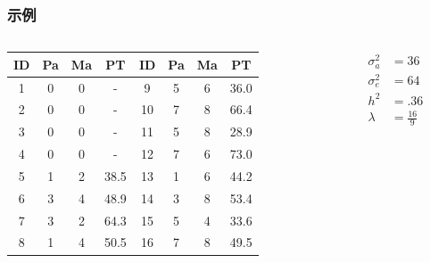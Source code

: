 \documentclass[serif,aspectratio=169]{beamer}
\begin{document}
\begin{frame}
  \frametitle{示例}
  \begin{columns}
    \begin{column}{.8\textwidth}
      \centering
      \begin{tabular}{cccc|cccc}
        ID & Pa & Ma & PT & ID & Pa & Ma & PT \\\hline
        1 & 0 & 0 &  -   &  9 & 5 & 6 & 36.0\\
        2 & 0 & 0 &  -   & 10 & 7 & 8 & 66.4\\
        3 & 0 & 0 &  -   & 11 & 5 & 8 & 28.9\\
        4 & 0 & 0 &  -   & 12 & 7 & 6 & 73.0\\
        5 & 1 & 2 & 38.5 & 13 & 1 & 6 & 44.2\\
        6 & 3 & 4 & 48.9 & 14 & 3 & 8 & 53.4\\
        7 & 3 & 2 & 64.3 & 15 & 5 & 4 & 33.6\\
        8 & 1 & 4 & 50.5 & 16 & 7 & 8 & 49.5 
      \end{tabular}
    \end{column}

    \begin{column}{.2\textwidth}
      \begin{align*}
        \sigma_a^2&=36\\
        \sigma_e^2&=64\\
        h^2 &=.36\\
        \lambda&=\frac{16}{9}
      \end{align*}
    \end{column}
  \end{columns}
\end{frame}
\end{document}
